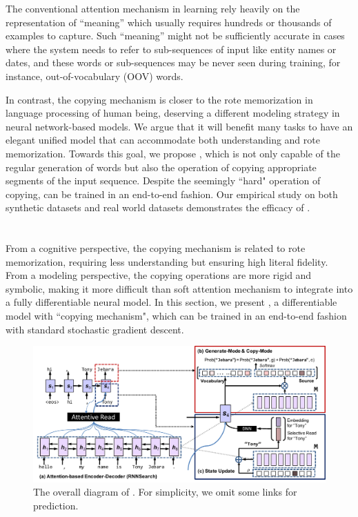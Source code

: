 The conventional attention mechanism in \sts learning rely heavily on the representation of ``meaning'' which usually requires hundreds or thousands of examples to capture. Such ``meaning'' might not be sufficiently accurate in cases where the system needs to refer to sub-sequences of input like entity names or dates, and these words or sub-sequences may be never seen during training, for instance, out-of-vocabulary (OOV) words. 

In contrast, the copying mechanism is closer to the rote memorization in language processing of human being, 
deserving a different modeling strategy in neural network-based models. We argue that it will benefit many \sts tasks to have an elegant unified model that can accommodate both understanding and rote memorization. Towards this goal, we propose \copynet, which is not only capable of the regular generation of words but also the operation of copying appropriate segments of the input sequence. Despite the seemingly ``hard" operation of copying, \copynet can be trained in an end-to-end fashion. Our empirical study on both synthetic datasets and real world datasets demonstrates the efficacy of \copynet.       
 
 
\section{\copynet}
From a cognitive perspective, the copying mechanism is related to rote memorization, requiring less understanding but ensuring high literal fidelity. From a modeling perspective, the copying operations are more rigid and symbolic, making it more difficult than soft attention mechanism to integrate into a fully differentiable neural model.
In this section, we present \copynet, a differentiable \sts model with ``copying mechanism", which can be trained in an end-to-end fashion with standard stochastic gradient descent. 

 \begin{figure}[htbp]
   	\centering
          	\includegraphics[width=1\linewidth]{figs/copynet/model-x.pdf} 
			  \caption{\label{cp3.fig.model} The overall diagram of \copynet. For simplicity, we omit some links for prediction. }
   \end{figure} 
   
